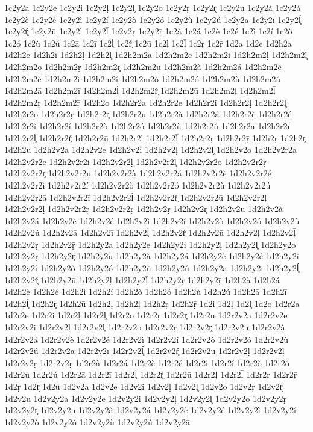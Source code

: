 {1c2y2a
1c2y2e
1c2y2i
1c2y2ḷ
1c2y2l̥
1c2y2o
1c2y2ṛ
1c2y2r̥
1c2y2u
1c2y2à
1c2y2á
1c2y2è
1c2y2é
1c2y2ì
1c2y2í
1c2y2ò
1c2y2ó
1c2y2ù
1c2y2ú
1c2y2ā
1c2y2ī
1c2y2ĺ̥
1c2y2ŕ̥
1c2y2ū
1c2y2ḷ
1c2y2ḹ
1c2y2ṛ
1c2y2ṝ
1c2à
1c2á
1c2è
1c2é
1c2ì
1c2í
1c2ò
1c2ó
1c2ù
1c2ú
1c2ā
1c2ī
1c2ĺ̥
1c2ŕ̥
1c2ū
1c2ḷ
1c2ḹ
1c2ṛ
1c2ṝ
1d2a
1d2e
1d2h2a
1d2h2e
1d2h2i
1d2h2ḷ
1d2h2l̥
1d2h2m2a
1d2h2m2e
1d2h2m2i
1d2h2m2ḷ
1d2h2m2l̥
1d2h2m2o
1d2h2m2ṛ
1d2h2m2r̥
1d2h2m2u
1d2h2m2à
1d2h2m2á
1d2h2m2è
1d2h2m2é
1d2h2m2ì
1d2h2m2í
1d2h2m2ò
1d2h2m2ó
1d2h2m2ù
1d2h2m2ú
1d2h2m2ā
1d2h2m2ī
1d2h2m2ĺ̥
1d2h2m2ŕ̥
1d2h2m2ū
1d2h2m2ḷ
1d2h2m2ḹ
1d2h2m2ṛ
1d2h2m2ṝ
1d2h2o
1d2h2r2a
1d2h2r2e
1d2h2r2i
1d2h2r2ḷ
1d2h2r2l̥
1d2h2r2o
1d2h2r2ṛ
1d2h2r2r̥
1d2h2r2u
1d2h2r2à
1d2h2r2á
1d2h2r2è
1d2h2r2é
1d2h2r2ì
1d2h2r2í
1d2h2r2ò
1d2h2r2ó
1d2h2r2ù
1d2h2r2ú
1d2h2r2ā
1d2h2r2ī
1d2h2r2ĺ̥
1d2h2r2ŕ̥
1d2h2r2ū
1d2h2r2ḷ
1d2h2r2ḹ
1d2h2r2ṛ
1d2h2r2ṝ
1d2h2ṛ
1d2h2r̥
1d2h2u
1d2h2v2a
1d2h2v2e
1d2h2v2i
1d2h2v2ḷ
1d2h2v2l̥
1d2h2v2o
1d2h2v2r2a
1d2h2v2r2e
1d2h2v2r2i
1d2h2v2r2ḷ
1d2h2v2r2l̥
1d2h2v2r2o
1d2h2v2r2ṛ
1d2h2v2r2r̥
1d2h2v2r2u
1d2h2v2r2à
1d2h2v2r2á
1d2h2v2r2è
1d2h2v2r2é
1d2h2v2r2ì
1d2h2v2r2í
1d2h2v2r2ò
1d2h2v2r2ó
1d2h2v2r2ù
1d2h2v2r2ú
1d2h2v2r2ā
1d2h2v2r2ī
1d2h2v2r2ĺ̥
1d2h2v2r2ŕ̥
1d2h2v2r2ū
1d2h2v2r2ḷ
1d2h2v2r2ḹ
1d2h2v2r2ṛ
1d2h2v2r2ṝ
1d2h2v2ṛ
1d2h2v2r̥
1d2h2v2u
1d2h2v2à
1d2h2v2á
1d2h2v2è
1d2h2v2é
1d2h2v2ì
1d2h2v2í
1d2h2v2ò
1d2h2v2ó
1d2h2v2ù
1d2h2v2ú
1d2h2v2ā
1d2h2v2ī
1d2h2v2ĺ̥
1d2h2v2ŕ̥
1d2h2v2ū
1d2h2v2ḷ
1d2h2v2ḹ
1d2h2v2ṛ
1d2h2v2ṝ
1d2h2y2a
1d2h2y2e
1d2h2y2i
1d2h2y2ḷ
1d2h2y2l̥
1d2h2y2o
1d2h2y2ṛ
1d2h2y2r̥
1d2h2y2u
1d2h2y2à
1d2h2y2á
1d2h2y2è
1d2h2y2é
1d2h2y2ì
1d2h2y2í
1d2h2y2ò
1d2h2y2ó
1d2h2y2ù
1d2h2y2ú
1d2h2y2ā
1d2h2y2ī
1d2h2y2ĺ̥
1d2h2y2ŕ̥
1d2h2y2ū
1d2h2y2ḷ
1d2h2y2ḹ
1d2h2y2ṛ
1d2h2y2ṝ
1d2h2à
1d2h2á
1d2h2è
1d2h2é
1d2h2ì
1d2h2í
1d2h2ò
1d2h2ó
1d2h2ù
1d2h2ú
1d2h2ā
1d2h2ī
1d2h2ĺ̥
1d2h2ŕ̥
1d2h2ū
1d2h2ḷ
1d2h2ḹ
1d2h2ṛ
1d2h2ṝ
1d2i
1d2ḷ
1d2l̥
1d2o
1d2r2a
1d2r2e
1d2r2i
1d2r2ḷ
1d2r2l̥
1d2r2o
1d2r2ṛ
1d2r2r̥
1d2r2u
1d2r2v2a
1d2r2v2e
1d2r2v2i
1d2r2v2ḷ
1d2r2v2l̥
1d2r2v2o
1d2r2v2ṛ
1d2r2v2r̥
1d2r2v2u
1d2r2v2à
1d2r2v2á
1d2r2v2è
1d2r2v2é
1d2r2v2ì
1d2r2v2í
1d2r2v2ò
1d2r2v2ó
1d2r2v2ù
1d2r2v2ú
1d2r2v2ā
1d2r2v2ī
1d2r2v2ĺ̥
1d2r2v2ŕ̥
1d2r2v2ū
1d2r2v2ḷ
1d2r2v2ḹ
1d2r2v2ṛ
1d2r2v2ṝ
1d2r2à
1d2r2á
1d2r2è
1d2r2é
1d2r2ì
1d2r2í
1d2r2ò
1d2r2ó
1d2r2ù
1d2r2ú
1d2r2ā
1d2r2ī
1d2r2ĺ̥
1d2r2ŕ̥
1d2r2ū
1d2r2ḷ
1d2r2ḹ
1d2r2ṛ
1d2r2ṝ
1d2ṛ
1d2r̥
1d2u
1d2v2a
1d2v2e
1d2v2i
1d2v2ḷ
1d2v2l̥
1d2v2o
1d2v2ṛ
1d2v2r̥
1d2v2u
1d2v2y2a
1d2v2y2e
1d2v2y2i
1d2v2y2ḷ
1d2v2y2l̥
1d2v2y2o
1d2v2y2ṛ
1d2v2y2r̥
1d2v2y2u
1d2v2y2à
1d2v2y2á
1d2v2y2è
1d2v2y2é
1d2v2y2ì
1d2v2y2í
1d2v2y2ò
1d2v2y2ó
1d2v2y2ù
1d2v2y2ú
1d2v2y2ā
}
